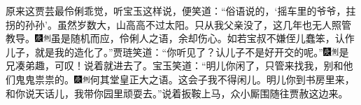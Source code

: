 原来这贾芸最伶俐乖觉，听宝玉这样说，便笑道：“俗语说的，‘摇车里的爷爷，拄拐的孙孙’。虽然岁数大，山高高不过太阳。只从我父亲没了，这几年也无人照管教导。{\includegraphics[width=3mm]{../Images/00004}\includegraphics[width=3mm]{../Images/00011}\footnotesize \kaishu 虽是随机而应，伶俐人之语，余却伤心。}如若宝叔不嫌侄儿蠢笨，认作儿子，就是我的造化了。”贾琏笑道：“你听见了？认儿子不是好开交的呢。”{\includegraphics[width=3mm]{../Images/00004}\includegraphics[width=3mm]{../Images/00011}\footnotesize \kaishu 是兄凑弟趣，可叹！}说着就进去了。宝玉笑道：“明儿你闲了，只管来找我，别和他们鬼鬼祟祟的。{\includegraphics[width=3mm]{../Images/00004}\includegraphics[width=3mm]{../Images/00011}\footnotesize \kaishu 何其堂皇正大之语。}这会子我不得闲儿。明儿你到书房里来，和你说天话儿，我带你园里顽耍去。”说着扳鞍上马，众小厮围随往贾赦这边来。

